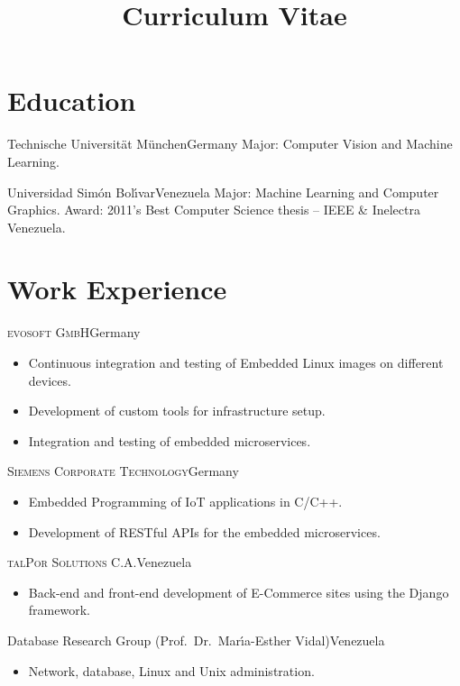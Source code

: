 \documentclass[10pt]{moderncv}
\title{Curriculum Vitae}
\begin{document}
\maketitle

\section{Education}

  {Technische Universit\"at M\"unchen}{Germany}{}{%
    Major: Computer Vision and Machine Learning.
  }

  {Universidad Sim\'on Bol\'{\i}var}{Venezuela}{}{%
    Major: Machine Learning and Computer Graphics.
    \newline
    Award: 2011's Best Computer Science thesis -- IEEE \& Inelectra Venezuela.
  }

\section{Work Experience}

{\textsc{evosoft GmbH}}{Germany}{}{%
\begin{itemize}
    \item Continuous integration and testing of Embedded Linux images on different devices.
    \item Development of custom tools for infrastructure setup.
    \item Integration and testing of embedded microservices.
\end{itemize}
}

{\textsc{Siemens Corporate Technology}}{Germany}{}{%
\begin{itemize}
  \item Embedded Programming of IoT applications in C/C++.
  \item Development of RESTful APIs for the embedded microservices.
\end{itemize}
}

{\textsc{talPor Solutions C.A.}}{Venezuela}{}{%
\begin{itemize}
  \item Back-end and front-end development of E-Commerce sites using the Django framework.
\end{itemize}
}

{Database Research Group (Prof.\ Dr.\ Mar\'{\i}a-Esther Vidal)}{Venezuela}{}{%
\begin{itemize}
  \item Network, database, Linux and Unix administration.
\end{itemize}
}
\end{document}
